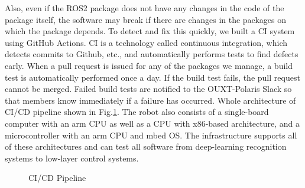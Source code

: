 \documentclass[lettersize,journal]{IEEEtran}
\begin{document}
Also, even if the ROS2 package does not have any changes in the code of the package itself,
the software may break if there are changes in the packages on which the package depends.
To detect and fix this quickly, we built a CI system using GitHub Actions.
CI is a technology called continuous integration, which detects commits to Github, etc.,
and automatically performs tests to find defects early.
When a pull request is issued for any of the packages we manage, a build test is automatically performed once a day.
If the build test fails, the pull request cannot be merged.
Failed build tests are notified to the OUXT-Polaris Slack so that members know immediately if a failure has occurred.
Whole architecture of CI/CD pipeline shown in Fig.\ref{fig:ci_cd_pipeline}.
The robot also consists of a single-board computer with an arm CPU as well as a CPU with x86-based architecture,
and a microcontroller with an arm CPU and mbed OS.
The infrastructure supports all of these architectures and 
can test all software from deep-learning recognition systems to low-layer control systems.

\begin{figure}[H]
    \begin{center}
  \end{center}
  \caption{CI/CD Pipeline}
  \label{fig:ci_cd_pipeline}
\end{figure}
\end{document}
